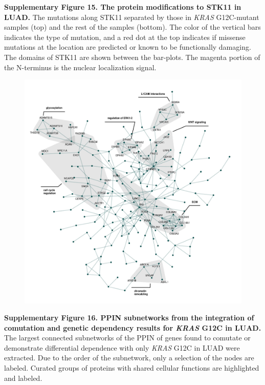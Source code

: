 \documentclass[english, 10pt, letterpaper]{article}
\newcommand{\KRAS}{\emph{KRAS}}
\begin{document}
\noindent \textbf{Supplementary Figure 15. The protein modifications to STK11 in LUAD.}
The mutations along STK11 separated by those in \KRAS{} G12C-mutant samples (top) and the rest of the samples (bottom). The color of the vertical bars indicates the type of mutation, and a red dot at the top indicates if missense mutations at the location are predicted or known to be functionally damaging. The domains of STK11 are shown between the bar-plots. The magenta portion of the N-terminus is the nuclear localization signal.
\newpage


\begin{figure}[h!]
\centering
\includegraphics[width=180mm]{figures/Supp_Fig_16.jpeg}
\label{sfig:luadG12C-integrated-ppin}
\end{figure}

\noindent \textbf{Supplementary Figure 16. PPIN subnetworks from the integration of comutation and genetic dependency results for \KRAS{} G12C in LUAD.}
The largest connected subnetworks of the PPIN of genes found to comutate or demonstrate differential dependence with only \KRAS{} G12C in LUAD were extracted. Due to the order of the subnetwork, only a selection of the nodes are labeled. Curated groups of proteins with shared cellular functions are highlighted and labeled.
\newpage
\end{document}
